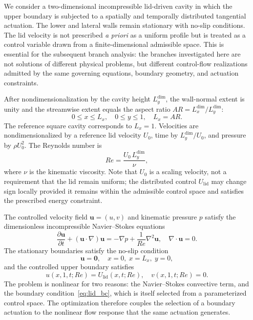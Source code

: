 \documentclass[a4paper,11pt]{article}
\begin{document}
We consider a two-dimensional incompressible lid-driven cavity in which the upper
boundary is subjected to a spatially and temporally distributed tangential actuation.
The lower and lateral walls remain stationary with no-slip conditions. The lid
velocity is not prescribed \emph{a priori} as a uniform profile but is treated as
a control variable drawn from a finite-dimensional admissible space. This is
essential for the subsequent branch analysis: the branches investigated here are
not solutions of different physical problems, but different control-flow realizations
admitted by the same governing equations, boundary geometry, and actuation constraints.

After nondimensionalization by the cavity height \(L_y^{\mathrm{dim}}\), the
wall-normal extent is unity and the streamwise extent equals the aspect ratio
\(AR=L_x^{\mathrm{dim}}/L_y^{\mathrm{dim}}\):
\begin{equation}
0\le x\le L_x,\quad 0\le y\le 1,\quad L_x=AR.
\label{eq:domain}
\end{equation}
The reference square cavity corresponds to \(L_x=1\). Velocities are
nondimensionalized by a reference lid velocity \(U_0\), time by
\(L_y^{\mathrm{dim}}/U_0\), and pressure by \(\rho U_0^2\). The Reynolds number is
\begin{equation}
Re=\frac{U_0\,L_y^{\mathrm{dim}}}{\nu},
\label{eq:reynolds}
\end{equation}
where \(\nu\) is the kinematic viscosity. Note that \(U_0\) is a scaling velocity,
not a requirement that the lid remain uniform; the distributed control
\(U_{\mathrm{lid}}\) may change sign locally provided it remains within the
admissible control space and satisfies the prescribed energy constraint.

The controlled velocity field \(\mathbf{u}=(u,v)\) and kinematic pressure \(p\)
satisfy the dimensionless incompressible Navier--Stokes equations
\begin{equation}
\frac{\partial\mathbf{u}}{\partial t}+(\mathbf{u}\cdot\nabla)\mathbf{u}
=-\nabla p+\frac{1}{Re}\nabla^2\mathbf{u},\quad
\nabla\cdot\mathbf{u}=0.
\label{eq:NS}
\end{equation}
The stationary boundaries satisfy the no-slip condition
\begin{equation}
\mathbf{u}=\mathbf{0},\quad x=0,\; x=L_x,\; y=0,
\label{eq:stationary_bc}
\end{equation}
and the controlled upper boundary satisfies
\begin{equation}
u(x,1,t;Re)=U_{\mathrm{lid}}(x,t;Re),\quad v(x,1,t;Re)=0.
\label{eq:lid_bc}
\end{equation}
The problem is nonlinear for two reasons: the Navier--Stokes convective term, and
the boundary condition~\eqref{eq:lid_bc}, which is itself selected from a
parameterized control space. The optimization therefore couples the selection of a
boundary actuation to the nonlinear flow response that the same actuation generates.
\end{document}
